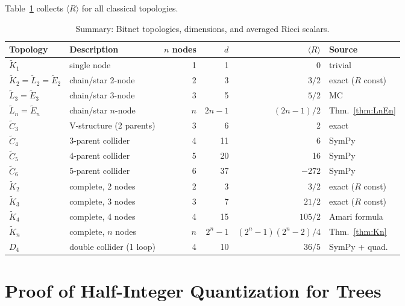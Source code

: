 \documentclass[11pt]{article}
\theoremstyle{definition}
\begin{document}
Table~\ref{tab:all_bitnets} collects $\langle R\rangle$ for all classical topologies.

\begin{table}[h]
\centering
\caption{Summary: Bitnet topologies, dimensions, and averaged Ricci scalars.}
\label{tab:all_bitnets}
\begin{tabular}{@{}llrrrl@{}}
\toprule
Topology & Description & $n$ nodes & $d$ & $\langle R\rangle$ & Source \\
\midrule
$\tilde{K}_1$ & single node & 1 & 1 & 0 & trivial \\
$\tilde{K}_2 = \tilde{L}_2 = \tilde{E}_2$ & chain/star 2-node & 2 & 3 & $3/2$ & exact ($R$ const) \\
$\tilde{L}_3 = \tilde{E}_3$ & chain/star 3-node & 3 & 5 & $5/2$ & MC \\
$\tilde{L}_n = \tilde{E}_n$ & chain/star $n$-node & $n$ & $2n{-}1$ & $(2n-1)/2$ & Thm.~\ref{thm:LnEn} \\
\midrule
$\tilde{C}_3$ & V-structure (2 parents) & 3 & 6 & 2 & exact \\
$\tilde{C}_4$ & 3-parent collider & 4 & 11 & 6 & SymPy \\
$\tilde{C}_5$ & 4-parent collider & 5 & 20 & 16 & SymPy \\
$\tilde{C}_6$ & 5-parent collider & 6 & 37 & $-272$ & SymPy \\
\midrule
$\tilde{K}_2$ & complete, 2 nodes & 2 & 3 & $3/2$ & exact ($R$ const) \\
$\tilde{K}_3$ & complete, 3 nodes & 3 & 7 & $21/2$ & exact ($R$ const) \\
$\tilde{K}_4$ & complete, 4 nodes & 4 & 15 & $105/2$ & Amari formula \\
$\tilde{K}_n$ & complete, $n$ nodes & $n$ & $2^n{-}1$ & $(2^n{-}1)(2^n{-}2)/4$ & Thm.~\ref{thm:Kn} \\
\midrule
$D_4$ & double collider (1 loop) & 4 & 10 & $36/5$ & SymPy + quad. \\
\bottomrule
\end{tabular}
\end{table}

\section{Proof of Half-Integer Quantization for Trees}\label{sec:proof_trees}
\end{document}
